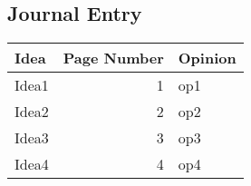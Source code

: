 \documentclass[11pt]{article}
\begin{document}
\subsection{Journal Entry}
\label{sec:org05e5aaf}
\begin{center}
\begin{tabular}{lrl}
Idea & Page Number & Opinion\\
\hline
Idea1 & 1 & op1\\
\hline
Idea2 & 2 & op2\\
\hline
Idea3 & 3 & op3\\
\hline
Idea4 & 4 & op4\\
\end{tabular}
\end{center}
\end{document}
